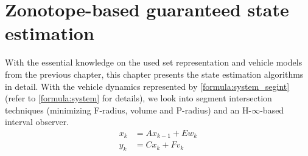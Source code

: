 \chapter{Zonotope-based guaranteed state estimation} \label{ch:state_estimation}
With the essential knowledge on the used set representation and vehicle models from the previous chapter, this chapter presents the state estimation algorithms in detail. With the vehicle dynamics represented by \eqref{formula:system_segint} (refer to \eqref{formula:system} for details), we look into segment intersection techniques (minimizing F-radius, volume and P-radius) and an H-$\infty$-based interval observer.
\begin{equation}
\label{formula:system_segint}
\begin{split}
x_{k} &= Ax_{k-1} + Ew_k\\
y_k &= Cx_k + Fv_k
\end{split}
\end{equation}
